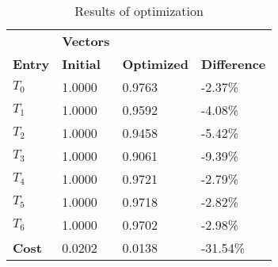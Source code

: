 \begin{table}[h!]
\centering
\begin{tabular}{llll}
\textbf{}      & \cellcolor[HTML]{EFEFEF}\textbf{Vectors} & \textbf{} & \textbf{}         \\
\rowcolor[HTML]{EFEFEF} 
\textbf{Entry} & \textbf{Initial} & \textbf{Optimized} & \textbf{Difference} \\
$T_0$ & 1.0000 & 0.9763 & -2.37\% \\ 
$T_1$ & 1.0000 & 0.9592 & -4.08\% \\ 
$T_2$ & 1.0000 & 0.9458 & -5.42\% \\ 
$T_3$ & 1.0000 & 0.9061 & -9.39\% \\ 
$T_4$ & 1.0000 & 0.9721 & -2.79\% \\ 
$T_5$ & 1.0000 & 0.9718 & -2.82\% \\ 
$T_6$ & 1.0000 & 0.9702 & -2.98\% \\ 
\rowcolor[HTML]{EFEFEF} 
\textbf{Cost}  & 0.0202 & 0.0138 & -31.54\% \\ 
\end{tabular}
\caption{Results of optimization}
\label{tab:OptimizationAnalysis}
\end{table}